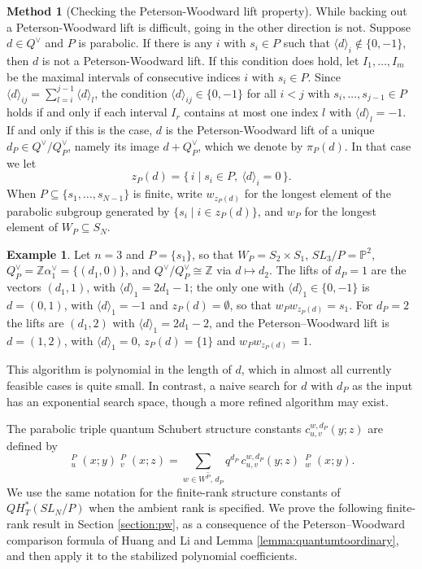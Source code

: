 \documentclass{amsart}
\theoremstyle{definition}
\newtheorem{example}[lemma]{Example}
\newtheorem{method}[lemma]{Method}
\theoremstyle{remark}
\numberwithin{equation}{section}
\DeclareMathOperator{\qsch}{\widetilde{\mathfrak{S}}}
\newcommand{\pcomp}[1]{\widehat{#1}}
\begin{document}
 \begin{method}[Checking the Peterson-Woodward lift property]
 While backing out a Peterson-Woodward lift is difficult, going in the other direction is not. Suppose $d\in Q^\vee$ and $P$ is parabolic. If there is any $i$ with $s_i\in P$ such that $\langle d\rangle_i\notin\{0,-1\}$, then $d$ is not a Peterson-Woodward lift. If this condition does hold, let $I_1,\ldots,I_m$ be the maximal intervals of consecutive indices $i$ with $s_i\in P$. Since $\langle d\rangle_{ij}=\sum_{l=i}^{j-1}\langle d\rangle_l$, the condition $\langle d\rangle_{ij}\in\{0,-1\}$ for all $i<j$ with $s_i,\ldots,s_{j-1}\in P$ holds if and only if each interval $I_r$ contains at most one index $l$ with $\langle d\rangle_l=-1$. If and only if this is the case, $d$ is the Peterson-Woodward lift of a unique $d_P\in Q^\vee/Q^\vee_P$, namely its image $d+Q^\vee_P$, which we denote by $\pi_P(d)$. In that case we let
$$z_P(d)=\{\,i\mid s_i\in P,\ \langle d\rangle_i=0\,\}.$$
When $P\subseteq\{s_1,\ldots,s_{N-1}\}$ is finite, write $w_{z_P(d)}$ for the longest element of the parabolic subgroup generated by $\{s_i\mid i\in z_P(d)\}$, and $w_P$ for the longest element of $W_P\subseteq S_N$.
 \end{method}

 \begin{example}
 Let $n=3$ and $P=\{s_1\}$, so that $W_P=S_2\times S_1$, $SL_3/P=\mathbb P^2$, $Q^\vee_P=\mathbb Z\alpha_1^\vee=\{(d_1,0)\}$, and $Q^\vee/Q^\vee_P\cong\mathbb Z$ via $d\mapsto d_2$. The lifts of $d_P=1$ are the vectors $(d_1,1)$, with $\langle d\rangle_1=2d_1-1$; the only one with $\langle d\rangle_1\in\{0,-1\}$ is $d=(0,1)$, with $\langle d\rangle_1=-1$ and $z_P(d)=\emptyset$, so that $w_Pw_{z_P(d)}=s_1$. For $d_P=2$ the lifts are $(d_1,2)$ with $\langle d\rangle_1=2d_1-2$, and the Peterson--Woodward lift is $d=(1,2)$, with $\langle d\rangle_1=0$, $z_P(d)=\{1\}$ and $w_Pw_{z_P(d)}=1$.
 \end{example}

 This algorithm is polynomial in the length of $d$, which in almost all currently feasible cases is quite small. In contrast, a naive search for $d$ with $d_P$ as the input has an exponential search space, though a more refined algorithm may exist.

 The parabolic triple quantum Schubert structure constants $c_{u,v}^{w,d_P}(y;z)$ are defined by
$$\qsch^P_u(x;y)\qsch^P_v(x;z)=\sum_{w\in W^{\pcomp P},\,d_P}q^{d_P}\,c_{u,v}^{w,d_P}(y;z)\,\qsch^P_w(x;y).$$
We use the same notation for the finite-rank structure constants of $QH_T^*(SL_N/P)$ when the ambient rank is specified. We prove the following finite-rank result in Section \ref{section:pw}, as a consequence of the Peterson--Woodward comparison formula of Huang and Li \cite{huang2015equivariant} and Lemma \ref{lemma:quantumtoordinary}, and then apply it to the stabilized polynomial coefficients.
\end{document}

